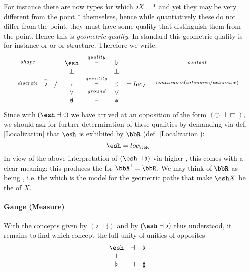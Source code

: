 For instance there are now types for which $\flat X = \ast$ and yet they may be very different from the point $\ast$ themselves, hence while quantiatively these do not differ from the point, they must have some quality that distinguish them from the point. Hence this  is \emph{geometric quality}. In standard  this geometric quality is for instance  or  or  or  structure.
Therefore we write:
\begin{displaymath}
\itexarray{
\stackrel{shape}{} && & \esh  &\stackrel{quality}{\dashv}& \flat &  & & \stackrel{content}{}
\\
&& & \bot &\stackrel{}{}& \bot
\\
\stackrel{discrete}{} &\overline{\flat}& / & \flat &\stackrel{quantity}{\dashv}& \sharp & = loc_{\not\not}  &   & \stackrel{continuous (intensive/extensive)}{}
\\
&& & \vee &\stackrel{ground}{}& \vee
\\
&& & \emptyset &\dashv& \ast &
}
\end{displaymath}
Since with $(\esh  \dashv \sharp)$ we have arrived at an opposition of the form $(\bigcirc \dashv \Box)$, we should ask for further determination of these qualities by demanding via def. \ref{Localization} that $\esh $ is exhibited by $\bbR$ (def. \ref{Localization}):
\begin{displaymath}
\esh  = loc_{\bbR}
\end{displaymath}
In view of the above interpretation of $(\esh \dashv \flat)$ via higher , this comes with a clear meaning: this produces the  for $\bbA^1 = \bbR$. We may think of $\bbR$ as being , i.e. the  which is the model for the geometric paths that make $\esh X$ be the  of $X$.
\hypertarget{gauge_measure}{}\paragraph*{{Gauge (Measure)}}\label{gauge_measure}
With the concepts given by $(\flat \dashv \sharp)$ and by $(\esh  \dashv \flat)$ thus understood, it remains to find which concept the full unity of unities of opposites
\begin{displaymath}
\itexarray{
\esh  &\dashv& \flat
\\
\bot && \bot
\\
\flat &\dashv& \sharp
}
\end{displaymath}
